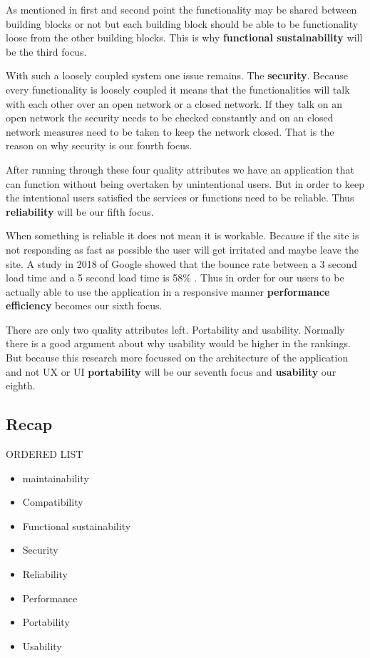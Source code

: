 As mentioned in first and second point the functionality may be shared between building blocks or not but each building block should be able to be functionality loose from the other building blocks. This is why \textbf{functional sustainability} will be the third focus.

With such a loosely coupled system one issue remains. The \textbf{security}. Because every functionality is loosely coupled it means that the functionalities will talk with each other over an open network or a closed network. If they talk on an open network the security needs to be checked constantly and on an closed network measures need to be taken to keep the network closed. That is the reason on why security is our fourth focus.

After running through these four quality attributes we have an application that can function without being overtaken by unintentional users. But in order to keep the intentional users satisfied the services or functions need to be reliable. Thus \textbf{reliability} will be our fifth focus.

When something is reliable it does not mean it is workable. Because if the site is not responding as fast as possible the user will get irritated and maybe leave the site. A study in 2018 of Google showed that the bounce rate between a 3 second load time and a 5 second load time is 58\% \cite{bounceRateDifference}. Thus in order for our users to be actually able to use the application in a responsive manner \textbf{performance efficiency} becomes our sixth focus.

There are only two quality attributes left. Portability and usability. Normally there is a good argument about why usability would be higher in the rankings. But because this research more focussed on the architecture of the application and not UX or UI \textbf{portability} will be our seventh focus and \textbf{usability} our eighth.

\subsection{Recap}
\label{sec:IsoRecap}

ORDERED LIST
\begin{itemize}
        \item maintainability
        \item Compatibility
        \item Functional sustainability
        \item Security
        \item Reliability
        \item Performance
        \item Portability
        \item Usability
\end{itemize}

